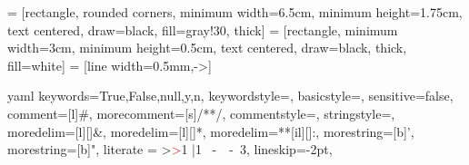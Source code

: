  = [rectangle, rounded corners, minimum width=6.5cm, minimum height=1.75cm, text centered, draw=black, fill=gray!30, thick]
 = [rectangle, minimum width=3cm, minimum height=0.5cm, text centered, draw=black, thick, fill=white]
 = [line width=0.5mm,->]

\makeatletter
\newcommand\language@yaml{yaml}

\expandafter\expandafter\expandafter\lstdefinelanguage
\expandafter{\language@yaml}
{
  keywords={True,False,null,y,n},
  keywordstyle=\color{darkgray}\mdseries\small,
  basicstyle=\YAMLkeystyle\ttfamily\mdseries\small,
  sensitive=false,
  comment=[l]{\#},
  morecomment=[s]{/*}{*/},
  commentstyle=\color{ForestGreen}\ttfamily\small,
  stringstyle=\YAMLvaluestyle\ttfamily\mdseries\small,
  moredelim=[l][\color{orange}]{\&},
  moredelim=[l][\color{magenta}]{*},
  moredelim=**[il][\YAMLcolonstyle{:}\YAMLvaluestyle]{:},
  morestring=[b]',
  morestring=[b]",
  literate =    {>}{{\textcolor{red}\textgreater}}1
                {|}{{\textcolor{red}\textbar}}1
                {\ -\ }{{\mdseries\ -\ }}3,                
  lineskip=-2pt,
}


\lst@AddToHook{EveryLine}{\ifx\lst@language\language@yaml\YAMLkeystyle\fi}
\makeatother

\makeatletter
\renewcommand{\@makeschapterhead}[1]{%
  \vspace*{0pt}%
  \chapterstarstyle{#1}{}%
  \vspace*{40pt}%
}
\makeatother


